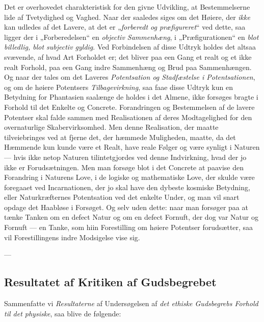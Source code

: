 \documentclass[12pt,a4paper]{book}
\newcommand{\opage}[1]{\marginnote{\footnotesize\textit{[#1]}}}
\begin{document}
Det er overhovedet charakteristisk for den givne Udvikling, at Bestemmelserne lide af
Tvetydighed og Vaghed. Naar der saaledes siges om det Høiere, der \emph{ikke} kan udledes af det
Lavere, at det er „\emph{forberedt og præfigureret}“ ved dette, saa ligger der i „Forberedelsen“
en \emph{objectiv Sammenhæng}, i „Præfigurationen“ en \emph{blot billedlig, blot subjectiv
gyldig}. Ved Forbindelsen af disse Udtryk holdes det altsaa svævende, af hvad Art
Forholdet er; det bliver paa een Gang et realt og et ikke realt Forhold, paa een Gang
indre Sammenhæng og Brud paa Sammenhængen. Og naar der tales om det Laveres
\emph{Potentsation og Stadfæstelse i Potentsationen}, og om de høiere Potentsers \emph{Tilbagevirkning}, saa faae disse Udtryk kun en Betydning for Phantasien saalænge de holdes
i det Almene, ikke forsøges bragte i Forhold til det Enkelte og Concrete. Forandringen og
Bestemmelsen af de lavere Potentser skal falde sammen med Realisationen af deres
Modtagelighed for den overnaturlige Skabervirksomhed. Men denne Realisation, der maatte
tilveiebringes ved at fjerne det, der hæmmede Muligheden, maatte, da det Hæmmende kun
kunde være et Realt, have reale Følger og \opage{93}være synligt i Naturen --- hvis ikke netop
Naturen tilintetgjordes ved denne Indvirkning, hvad der jo ikke er Forudsætningen. Men man
forsøge blot i det Concrete at paavise den Forandring i Naturens Love, i de logiske og
mathematiske Love, der skulde være foregaaet ved Incarnationen, der jo skal have den
dybeste kosmiske Betydning, eller Naturkræfternes Potentsation ved det enkelte Under, og
man vil snart opdage det Haabløse i Forsøget. Og selv uden dette: naar man forsøger paa at
tænke Tanken om en defect Natur og om en defect Fornuft, der dog var Natur og Fornuft ---
en Tanke, som hiin Forestilling om høiere Potentser forudsætter, saa vil Forestillingens
indre Modsigelse vise sig.

\begin{center}---\end{center}

\subsection{Resultatet af Kritiken af Gudsbegrebet}
\label{ssec:gudsbegreb-resultat}

Sammenfatte vi \emph{Resultaterne} af Undersøgelsen af \emph{det ethiske Gudsbegrebs Forhold til det physiske}, saa blive de følgende:
\end{document}
